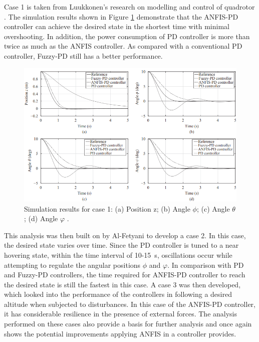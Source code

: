 Case 1 is taken from Luukkonen’s research on modelling and control of quadrotor \cite{boxi6}. The simulation results shown in Figure \ref{fig:referencepic} demonstrate that the ANFIS-PD controller can achieve the desired state in the shortest time with minimal overshooting. In addition, the power consumption of PD controller is more than twice as much as the ANFIS controller. As compared with a conventional PD controller, Fuzzy-PD still has a better performance.
\begin{figure}[H]
    \centering
    \includegraphics[width = 0.7 \textwidth]{img/Picture2.png}
    \caption[Simulation results for case 1: (a) Position z; (b) Angle $\phi$; (c) Angle $\theta$; (d) Angle $\varphi$.]{Simulation results for case 1: (a) Position z; (b) Angle $\phi$; (c) Angle $\theta$; (d) Angle $\varphi$ \cite{boxi5}.}
    \label{fig:referencepic}
\end{figure}
This analysis was then built on by Al-Fetyani to develop a case 2. In this case, the desired state varies over time. Since the PD controller is tuned to a near hovering state, within the time interval of 10-\SI{15}{\second}, oscillations occur while attempting to regulate the angular positions $\phi$ and $\varphi$. In comparison with PD and Fuzzy-PD controllers, the time required for ANFIS-PD controller to reach the desired state is still the fastest in this case. A case 3 was then developed, which looked into the performance of the controllers in following a desired altitude when subjected to disturbances. In this case of the ANFIS-PD controller, it has considerable resilience in the presence of external forces. The analysis performed on these cases also provide a basis for further analysis and once again shows the potential improvements applying ANFIS in a controller provides. 

